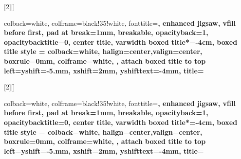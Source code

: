   [2][]{
    colback=white,
    colframe=black!35!white,
    fonttitle=\bfseries,
    enhanced jigsaw,
    vfill before first, 
    pad at break=1mm,
    breakable,
    opacityback=1,
    opacitybacktitle=0,
    center title,
    varwidth boxed title*=-4cm,
    boxed title style = {
    colback=white,
    halign=center,valign=center,
    boxrule=0mm,
    colframe=white,
    },
    attach boxed title to top left={yshift=-5.mm, xshift=2mm, yshifttext=-4mm},
    title={      
        }
    }

    [2][]{
      colback=white,
      colframe=black!35!white,
      fonttitle=\bfseries,
      enhanced jigsaw,
      vfill before first, 
      pad at break=1mm,
      breakable,
      opacityback=1,
      opacitybacktitle=0,
      center title,
      varwidth boxed title*=-4cm,
      boxed title style = {
      colback=white,
      halign=center,valign=center,
      boxrule=0mm,
      colframe=white,
      },
      attach boxed title to top left={yshift=-5.mm, xshift=2mm, yshifttext=-4mm},
      title={      
          }
      }